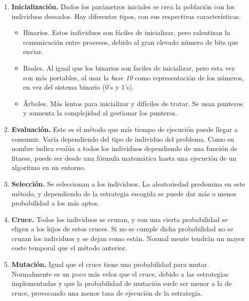 	\begin{enumerate}
		\item \textbf{Inicialización.} Dados los parámetros iniciales se crea la población con los individuos deseados. Hay diferentes tipos, con sus respectivas características.
		\begin{itemize}
			\item Binarios. Estos individuos son fáciles de inicializar, pero ralentizan la comunicación entre procesos, debido al gran elevado número de bits que enviar.
			\item Reales. Al igual que los binarios son faciles de inicializar, pero esta vez son más portables, al usar la \textit{base 10} como representación de los números, en vez del sistema binario (0's y 1's). 
			\item Árboles. Más lentos para inicializar y difíciles de tratar. Se usan punteros y aumenta la complejidad al gestionar los punteros.
		\end{itemize}
		
		\item \textbf{Evaluación.} Este es el método que más tiempo de ejecución puede llegar a consumir. Varía dependiendo del tipo de individuo del problema. Como su nombre indica evalúa a todos los individuos dependiendo de una función de fitness, puede ser desde una fórmula matemática hasta una ejecución de un algoritmo en un entorno.
		
		\item \textbf{Selección.} Se seleccionan a los individuos. La aleatoriedad predomina en este método, y dependiendo de la estrategia escogida se puede dar más o menos probabilidad a los más aptos. 
		
		\item \textbf{Cruce.} Todos los individuos se cruzan, y con una cierta probabilidad se eligen a los hijos de estos cruces. Si no se cumple dicha probabilidad no se cruzan los individuos y se dejan como están. Normal mente tendrán un mayor coste temporal que el método anterior.
		
		\item \textbf{Mutación.} Igual que el cruce tiene una probabilidad para mutar. Normalmente es un poco más veloz que el cruce, debido a las estrategias implementadas y que la probabilidad de mutación suele ser menor a la de cruce, provocando una menor tasa de ejecución de la estrategia.
	\end{enumerate}
	
